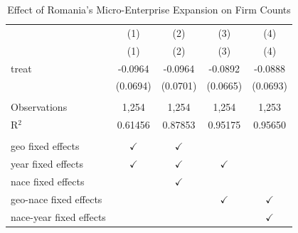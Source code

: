 \begin{table}[htbp]
   \caption{\label{tab:main_did} Effect of Romania's Micro-Enterprise Expansion on Firm Counts}
   \bigskip
   \centering
   \begin{tabular}{lcccc}
      \toprule
                              & (1)           & (2)           & (3)           & (4) \\   
                              & (1)           & (2)           & (3)           & (4)\\  
      \midrule 
      treat                   & -0.0964       & -0.0964       & -0.0892       & -0.0888\\   
                              & (0.0694)      & (0.0701)      & (0.0665)      & (0.0693)\\   
       \\
      Observations            & 1,254         & 1,254         & 1,254         & 1,253\\  
      R$^2$                   & 0.61456       & 0.87853       & 0.95175       & 0.95650\\  
       \\
      geo fixed effects       & $\checkmark$  & $\checkmark$  &               & \\  
      year fixed effects      & $\checkmark$  & $\checkmark$  & $\checkmark$  & \\  
      nace fixed effects      &               & $\checkmark$  &               & \\  
      geo-nace fixed effects  &               &               & $\checkmark$  & $\checkmark$\\   
      nace-year fixed effects &               &               &               & $\checkmark$\\   
      \bottomrule
   \end{tabular}
\end{table}
